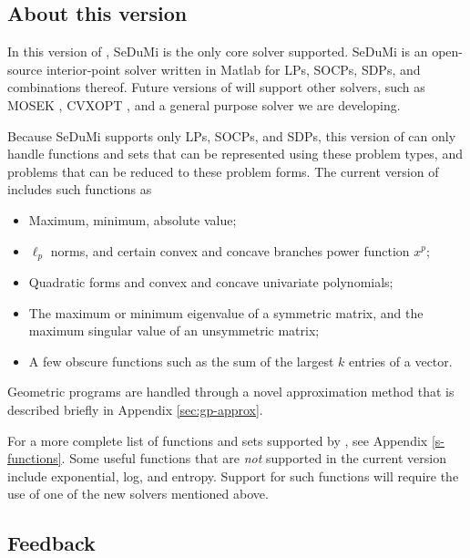 \documentclass[12pt]{article}
\begin{document}
\subsection{About this version}
\label{sec:version}
In this version of \cvx,
SeDuMi \cite{Stu:99} is the only core solver supported.
SeDuMi is an open-source interior-point solver written in Matlab for 
LPs, SOCPs, SDPs, and combinations thereof.
Future versions of \cvx will support other solvers, such as
MOSEK \cite{MOSEK}, CVXOPT \cite{CVXOPT}, 
and a general purpose solver we are developing.

Because SeDuMi supports only LPs, SOCPs, and SDPs, this
version of \cvx can only handle functions and sets that can be represented
using these problem types, and problems that can be reduced to 
these problem forms.
The current version of \cvx includes such functions as
\begin{itemize}
	\item Maximum, minimum, absolute value;
	\item $\ell_p$ norms, and certain convex and concave branches
	      power function $x^p$;
	\item Quadratic forms and convex and concave univariate polynomials;
	\item The maximum or minimum eigenvalue of a symmetric matrix, and
	      the maximum singular value of an unsymmetric matrix;
	\item A few obscure functions such as the 
          sum of the largest $k$ entries of a vector. 
\end{itemize}
Geometric programs are handled through a novel approximation
method that is described briefly in Appendix \ref{sec:gp-approx}.

For a more complete list of functions and sets supported by \cvx, 
see Appendix \ref{s-functions}. Some useful functions that are \emph{not} supported in
the current version include exponential, log, and entropy.
Support for such functions will require the use
of one of the new solvers mentioned above.

\subsection{Feedback}
\label{sec:feedback}
\end{document}

